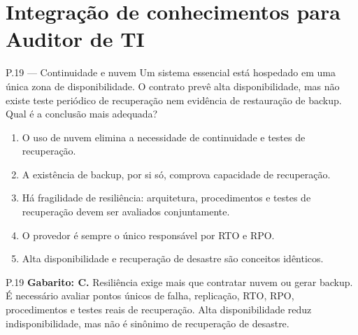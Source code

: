 \section{Integração de conhecimentos para Auditor de TI}

\begin{questao}{ P.19 — Continuidade e nuvem}
Um sistema essencial está hospedado em uma única zona de disponibilidade. O contrato prevê alta disponibilidade, mas não existe teste periódico de recuperação nem evidência de restauração de backup. Qual é a conclusão mais adequada?
\begin{enumerate}[label=\Alph*)]
\item O uso de nuvem elimina a necessidade de continuidade e testes de recuperação.
\item A existência de backup, por si só, comprova capacidade de recuperação.
\item Há fragilidade de resiliência: arquitetura, procedimentos e testes de recuperação devem ser avaliados conjuntamente.
\item O provedor é sempre o único responsável por RTO e RPO.
\item Alta disponibilidade e recuperação de desastre são conceitos idênticos.
\end{enumerate}
\end{questao}
\begin{solucao}{P.19}
\textbf{Gabarito: C.} Resiliência exige mais que contratar nuvem ou gerar backup. É necessário avaliar pontos únicos de falha, replicação, RTO, RPO, procedimentos e testes reais de recuperação. Alta disponibilidade reduz indisponibilidade, mas não é sinônimo de recuperação de desastre.
\end{solucao}

